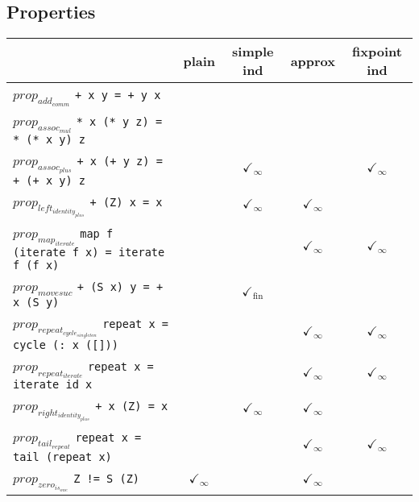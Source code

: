 \documentclass{article}
\begin{document}
\subsection*{Properties}
\begin{longtable}{p{10cm} || c | c | c | c | }
  & plain & simple ind & approx & fixpoint ind \\
\hline
$prop_{add_{comm}}$ \newline \verb`+ x y = + y x` &  &  &  &  \\
\hline
$prop_{assoc_{mul}}$ \newline \verb`* x (* y z) = * (* x y) z` &  &  &  &  \\
\hline
$prop_{assoc_{plus}}$ \newline \verb`+ x (+ y z) = + (+ x y) z` &  & $\checkmark_{\infty}$ &  & $\checkmark_{\infty}$ \\
\hline
$prop_{left_{identity_{plus}}}$ \newline \verb`+ (Z) x = x` &  & $\checkmark_{\infty}$ & $\checkmark_{\infty}$ &  \\
\hline
$prop_{map_{iterate}}$ \newline \verb`map f (iterate f x) = iterate f (f x)` &  &  & $\checkmark_{\infty}$ & $\checkmark_{\infty}$ \\
\hline
$prop_{movesuc}$ \newline \verb`+ (S x) y = + x (S y)` &  & $\checkmark_{\mathrm{fin}}$ &  &  \\
\hline
$prop_{repeat_{cycle_{singleton}}}$ \newline \verb`repeat x = cycle (: x ([]))` &  &  & $\checkmark_{\infty}$ & $\checkmark_{\infty}$ \\
\hline
$prop_{repeat_{iterate}}$ \newline \verb`repeat x = iterate id x` &  &  & $\checkmark_{\infty}$ & $\checkmark_{\infty}$ \\
\hline
$prop_{right_{identity_{plus}}}$ \newline \verb`+ x (Z) = x` &  & $\checkmark_{\infty}$ & $\checkmark_{\infty}$ &  \\
\hline
$prop_{tail_{repeat}}$ \newline \verb`repeat x = tail (repeat x)` &  &  & $\checkmark_{\infty}$ & $\checkmark_{\infty}$ \\
\hline
$prop_{zero_{is_{one}}}$ \newline \verb`Z != S (Z)` & $\checkmark_{\infty}$ &  & $\checkmark_{\infty}$ &  \\
\end{longtable}
\end{document}
